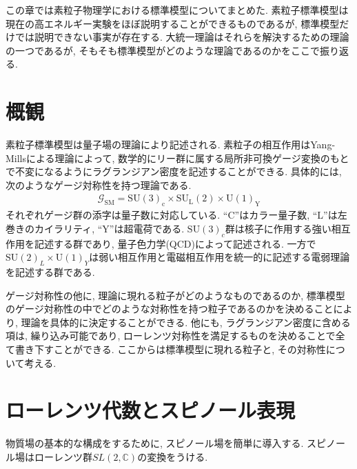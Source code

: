 %
%
この章では素粒子物理学における標準模型についてまとめた.
素粒子標準模型は現在の高エネルギー実験をほぼ説明することができるものであるが, 標準模型だけでは説明できない事実が存在する.
大統一理論はそれらを解決するための理論の一つであるが, そもそも標準模型がどのような理論であるのかをここで振り返る.
\section{概観}
素粒子標準模型は量子場の理論により記述される.
素粒子の相互作用はYang-Millsによる理論によって, 数学的にリー群に属する局所非可換ゲージ変換のもとで不変になるようにラグランジアン密度を記述することができる.
具体的には, 次のようなゲージ対称性を持つ理論である.
\begin{align}
  \mathcal{G}_{\text{SM}}=\mathrm{SU}(3)_\mathrm{c}\times \mathrm{SU}_\mathrm{L}(2)\times \mathrm{U}(1)_\mathrm{Y}\label{SM-Gauge}
\end{align}
それぞれゲージ群の添字は量子数に対応している.
``C''はカラー量子数, ``L''は左巻きのカイラリティ, ``Y''は超電荷である.
$\mathrm{SU}(3)_c$群は核子に作用する強い相互作用を記述する群であり, 量子色力学(QCD)によって記述される.\cite{grossUltravioletBehaviorNonAbelian1973,politzerReliablePerturbativeResults1973,weinbergNonAbelianGaugeTheories1973}
一方で$\mathrm{SU}(2)_L\times \mathrm{U}(1)_Y$は弱い相互作用と電磁相互作用を統一的に記述する電弱理論を記述する群である.
\cite{glashowPartialsymmetriesWeakInteractions1961,salamWeakElectromagneticInteractions1968,weinbergModelLeptons1967}

ゲージ対称性の他に, 理論に現れる粒子がどのようなものであるのか, 標準模型のゲージ対称性の中でどのような対称性を持つ粒子であるのかを決めることにより, 理論を具体的に決定することができる.
他にも, ラグランジアン密度に含める項は, 繰り込み可能であり, ローレンツ対称性を満足するものを決めることで全て書き下すことができる.
ここからは標準模型に現れる粒子と, その対称性について考える.
\section{ローレンツ代数とスピノール表現}
物質場の基本的な構成をするために, スピノール場を簡単に導入する.
スピノール場はローレンツ群$SL(2,\mathbb{C})$の変換をうける.

